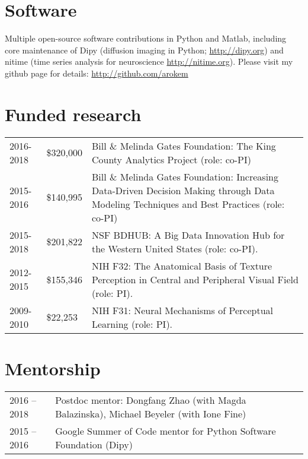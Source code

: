 \documentclass[11pt,fullpage]{article}
\begin{document}
\section*{Software}
\vspace{-2mm}
Multiple open-source software contributions in Python and Matlab, including core maintenance of Dipy (diffusion imaging in Python; \url{http://dipy.org}) and nitime (time series analysis for neuroscience \url{http://nitime.org}). Please visit my github page for details: \url{http://github.com/arokem}

\vspace{-2mm}
\section*{Funded research}
\vspace{-2mm}
\begin{tabular}{llp{12cm}}
  2016-2018 & \$320,000 & Bill \& Melinda Gates Foundation: The King County Analytics Project (role: co-PI) \\
  2015-2016 & \$140,995 & Bill \& Melinda Gates Foundation: Increasing Data-Driven Decision Making through Data Modeling Techniques and Best Practices (role: co-PI)\\
  2015-2018 & \$201,822 & NSF BDHUB: A Big Data Innovation Hub for the Western United States (role: co-PI).\\
  2012-2015 & \$155,346 & NIH F32: The Anatomical Basis of Texture Perception in Central and Peripheral Visual Field (role: PI). \\
  2009-2010 &  \$22,253 & NIH F31: Neural Mechanisms of Perceptual Learning (role: PI).\\
\end{tabular}


\vspace{-2mm}
\section*{Mentorship}
\vspace{-2mm}
\begin{longtable}{p{1.0in}|p{5.5in}}

2016 -- 2018 & Postdoc mentor: Dongfang Zhao (with Magda Balazinska), Michael Beyeler (with Ione Fine) \\

2015 -- 2016 & Google Summer of Code mentor for Python Software Foundation (Dipy)\\

\end{longtable}
\end{document}
